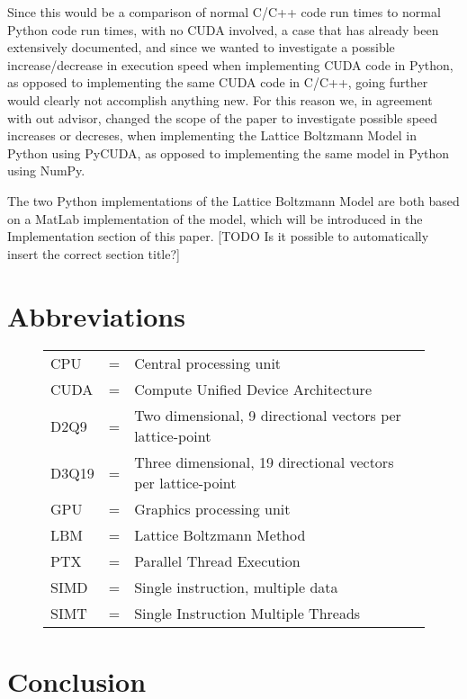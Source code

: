 Since this would be a comparison of normal C/C++ code run times to normal Python code run times, with no CUDA involved, a case that has already been extensively documented, and since we wanted to investigate a possible increase/decrease in execution speed when implementing CUDA code in Python, as opposed to implementing the same CUDA code in C/C++, going further would clearly not accomplish anything new. For this reason we, in agreement with out advisor, changed the scope of the paper to investigate possible speed increases or decreses, when implementing the Lattice Boltzmann Model in Python using PyCUDA, as opposed to implementing the same model in Python using NumPy.

The two Python implementations of the Lattice Boltzmann Model are both based on a MatLab implementation of the model, which will be introduced in the Implementation section of this paper. [TODO Is it possible to automatically insert the correct section title?]

\newpage

\section{Abbreviations}

\begin{figure}[htb]
\centering
	\begin{tabular}{lcl}
	    CPU & = & Central processing unit\\
	    CUDA & = & Compute Unified Device Architecture\\
		D2Q9 & = & Two dimensional, 9 directional vectors per lattice-point\\
		D3Q19 & = & Three dimensional, 19 directional vectors per lattice-point\\
		GPU & = & Graphics processing unit\\
		LBM & = & Lattice Boltzmann Method\\
		PTX & = & Parallel Thread Execution\\
		SIMD & = & Single instruction, multiple data\\
		SIMT & = & Single Instruction Multiple Threads
	\end{tabular}
\end{figure}

\newpage


\newpage


\newpage


\newpage


\section{Conclusion}


\newpage


\newpage





